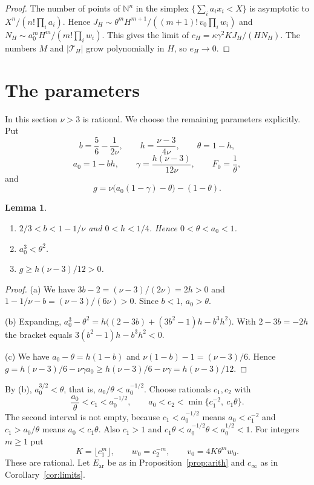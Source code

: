 \documentclass[11pt]{amsart}
\newtheorem{lemma}[theorem]{Lemma}
\theoremstyle{definition}
\theoremstyle{remark}
\numberwithin{equation}{section}
\newcommand{\N}{\mathbb N}
\newcommand{\Ear}{E_{\mathrm{ar}}}
\newcommand{\cT}{\mathcal T}
\begin{document}
\begin{proof}
The number of points of $\N^n$ in the simplex $\{\sum_ia_ix_i<X\}$ is asymptotic to $X^n/(n!\prod_ia_i)$. Hence
$J_H\sim\theta^mH^{m+1}/((m+1)!\,v_0\prod_iw_i)$ and $N_H\sim a_0^mH^m/(m!\prod_iw_i)$. This gives the limit
of $c_H=\kappa\gamma^2KJ_H/(HN_H)$. The numbers $M$ and $|\cT_H|$ grow polynomially in $H$, so
$e_H\to0$.
\end{proof}

\section{The parameters}\label{sec:params}

In this section $\nu>3$ is rational. We choose the remaining parameters explicitly. Put
\[
 b=\frac56-\frac1{2\nu},\qquad h=\frac{\nu-3}{4\nu},\qquad\theta=1-h,
\]
\[
 a_0=1-bh,\qquad\gamma=\frac{h(\nu-3)}{12\nu},\qquad F_0=\frac1\theta,
\]
and
\[
 g=\nu\bigl(a_0(1-\gamma)-\theta\bigr)-(1-\theta).
\]

\begin{lemma}\label{lem:abc}
\begin{enumerate}[label=(\alph*)]
\item $2/3<b<1-1/\nu$ and $0<h<1/4$. Hence $0<\theta<a_0<1$.
\item $a_0^3<\theta^2$.
\item $g\ge h(\nu-3)/12>0$.
\end{enumerate}
\end{lemma}

\begin{proof}
(a) We have $3b-2=(\nu-3)/(2\nu)=2h>0$ and $1-1/\nu-b=(\nu-3)/(6\nu)>0$. Since $b<1$, $a_0>\theta$.

(b) Expanding,
$a_0^3-\theta^2=h\bigl((2-3b)+(3b^2-1)h-b^3h^2\bigr)$. With $2-3b=-2h$ the bracket equals
$3(b^2-1)h-b^3h^2<0$.

(c) We have $a_0-\theta=h(1-b)$ and $\nu(1-b)-1=(\nu-3)/6$. Hence
$g=h(\nu-3)/6-\nu\gamma a_0\ge h(\nu-3)/6-\nu\gamma=h(\nu-3)/12$.
\end{proof}

By (b), $a_0^{3/2}<\theta$, that is, $a_0/\theta<a_0^{-1/2}$. Choose rationals $c_1,c_2$ with
\[
 \frac{a_0}\theta<c_1<a_0^{-1/2},\qquad a_0<c_2<\min\{c_1^{-2},\ c_1\theta\}.
\]
The second interval is not empty, because $c_1<a_0^{-1/2}$ means $a_0<c_1^{-2}$ and $c_1>a_0/\theta$ means
$a_0<c_1\theta$. Also $c_1>1$ and $c_1\theta<a_0^{-1/2}\theta<a_0^{1/2}<1$. For integers $m\ge1$ put
\begin{equation}\label{eq:choice}
 K=\lfloor c_1^m\rfloor,\qquad w_0=c_2^{-m},\qquad v_0=4K\theta^mw_0.
\end{equation}
These are rational. Let $\Ear$ be as in Proposition~\ref{prop:arith} and $c_\infty$ as in
Corollary~\ref{cor:limits}.
\end{document}
